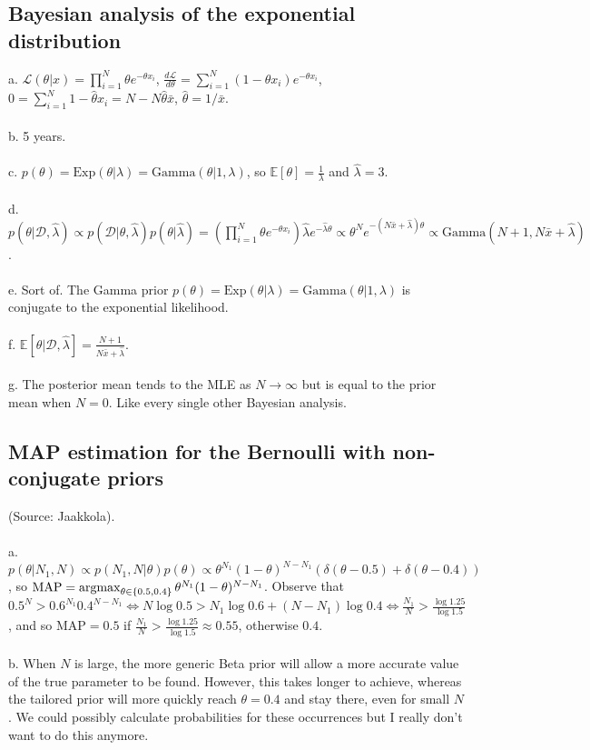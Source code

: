 \subsection{Bayesian analysis of the exponential distribution}
a. $\mathcal{L}(\theta|x) = \prod_{i=1}^N \theta e^{-\theta x_i}$, $\frac{d\mathcal{L}}{d\theta} = \sum_{i=1}^N (1-\theta x_i)e^{-\theta x_i}$, $0 = \sum_{i=1}^N 1-\hat\theta x_i = N - N\hat\theta \bar{x}$, $\hat\theta = 1/\bar{x}$.\\\\
b. 5 years.\\\\
c. $p(\theta) = \mathrm{Exp}(\theta|\lambda) = \mathrm{Gamma}(\theta|1, \lambda)$, so $\mathbb{E}[\theta] = \frac{1}{\lambda}$ and $\hat\lambda = 3$.\\\\
d. $p(\theta|\mathcal{D}, \hat\lambda) \propto p(\mathcal{D}|\theta,\hat\lambda)p(\theta|\hat\lambda) = \left(\prod_{i=1}^N \theta e^{-\theta x_i}\right) \hat\lambda e^{-\hat\lambda\theta} \propto \theta^N e^{-(N\bar{x}+\hat\lambda)\theta} \propto \mathrm{Gamma}(N+1, N\bar{x}+\hat\lambda)$.\\\\
e. Sort of. The Gamma prior $p(\theta) = \mathrm{Exp}(\theta|\lambda) = \mathrm{Gamma}(\theta|1, \lambda)$ is conjugate to the exponential likelihood.\\\\
f. $\mathbb{E}[\theta|\mathcal{D},\hat\lambda] = \frac{N+1}{N\bar{x}+\hat\lambda}$.\\\\
g. The posterior mean tends to the MLE as $N\rightarrow\infty$ but is equal to the prior mean when $N=0$. Like every single other Bayesian analysis.

\subsection{MAP estimation for the Bernoulli with non-conjugate priors}
(Source: Jaakkola).\\\\
a. $p(\theta|N_1, N) \propto p(N_1, N|\theta)p(\theta) \propto \theta^{N_1}(1-\theta)^{N-N_1} (\delta(\theta-0.5)+\delta(\theta-0.4))$, so $\mathrm{MAP} = \operatorname*{argmax}_{\theta\in\{0.5,0.4\}} \theta^{N_1}(1-\theta)^{N-N_1}$. Observe that $0.5^N > 0.6^{N_1}0.4^{N-N_1} \iff N\log0.5 > N_1\log0.6 + (N-N_1)\log0.4 \iff \frac{N_1}{N} > \frac{\log1.25}{\log1.5}$, and so $\mathrm{MAP} = 0.5$ if $\frac{N_1}{N} > \frac{\log1.25}{\log1.5} \approx 0.55$, otherwise $0.4$.\\\\
b. When $N$ is large, the more generic Beta prior will allow a more accurate value of the true parameter to be found. However, this takes longer to achieve, whereas the tailored prior will more quickly reach $\theta = 0.4$ and stay there, even for small $N$. We could possibly calculate probabilities for these occurrences but I really don't want to do this anymore.

